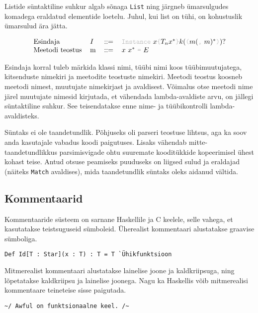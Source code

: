 \documentclass[12pt]{article}
\begin{document}
    Listide süntaktiline suhkur algab sõnaga \verb!List! ning järgneb ümarsulgudes komadega eraldatud elementide loetelu. Juhul, kui list on tühi, on kohustuslik ümarsulud ära jätta.

    \begin{equation*}
      \begin{tabular}{llll}
        Esindaja        & $I$ & $::=$ & {\color{helehall}\verb!Instance!} $x${\color{helehall}\verb!{!}$T_n x^*${\color{helehall}\verb!}!}$k(${\color{helehall}\verb!(!}$m(${\color{helehall}\verb!,!} $m)^*${\color{helehall}\verb!)!}$)?$ \\
        Meetodi teostus & m   & $::=$ & $x$ $x^*$ {\color{helehall}\verb!=!} $E$
      \end{tabular}
    \end{equation*}

    Esindaja korral tuleb märkida klassi nimi, tüübi nimi koos tüübimuutujatega, kitsenduste nimekiri ja meetodite teostuste nimekiri. Meetodi teostus koosneb meetodi nimest, muutujate nimekirjast ja avaldisest. Võimalus otse meetodi nime järel muutujate nimesid kirjutada, et vähendada lambda-avaldiste arvu, on jällegi süntaktiline suhkur. See teisendatakse enne nime- ja tüübikontrolli lambda-avaldisteks.

    Süntaks ei ole taandetundlik. Põhjuseks oli parseri teostuse lihtsus, aga ka soov anda kasutajale vabadus koodi paigutuses. Lisaks vähendab mitte-taandetundlikkus parsimisvigade ohtu suuremate kooditükkide kopeerimisel ühest kohast teise. Antud otsuse peamiseks puuduseks on liigsed sulud ja eraldajad (näiteks \verb!Match! avaldises), mida taandetundlik süntaks oleks aidanud vältida.
    \subsection{Kommentaarid}\label{kommentaarid}
      Kommentaaride süsteem on sarnane Haskellile ja C keelele, selle vahega, et kasutatakse teistsuguseid sümboleid. Üherealist kommentaari alustatakse graavise sümboliga.

      \begin{verbatim}Def Id[T : Star](x : T) : T = T `Ühikfunktsioon\end{verbatim}

      Mitmerealist kommentaari alustatakse lainelise joone ja kaldkriipsuga, ning lõpetatakse kaldkriipsu ja lainelise joonega. Nagu ka Haskellis võib mitmerealisi kommentaare teineteise sisse paigutada.

      \begin{verbatim}~/ Awful on funktsionaalne keel. /~\end{verbatim}
\end{document}
